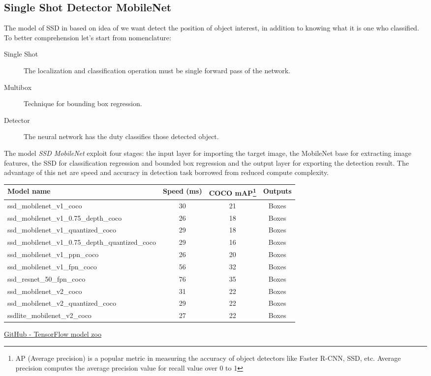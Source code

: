 \subsection{Single Shot Detector MobileNet}
\label{ssec:single-shot-detector}
The model of SSD in based on idea of we want detect the position of object
interest, in addition to knowing what it is one who classified. To better
comprehension let's start from nomenclature:
\begin{description}
\item[Single Shot] The localization and classification operation must be single forward pass of the network.
\item[Multibox] Technique for bounding box regression.
\item[Detector] The neural network has the duty classifies those detected object.
\end{description}
%
The model \emph{SSD MobileNet} exploit four stages: the input layer for
importing the target image, the MobileNet base for extracting image features,
the SSD for classification regression and bounded box regression and the output
layer for exporting the detection result.\cite{Li_2018} 
The advantage of this net are speed and accuracy in detection task borrowed from
reduced compute complexity.
%
\begin{table}[htb]
	\centering
	\begin{tabular}{l c c c}
	\hline
		Model name								&Speed (ms)	& COCO mAP\footnote{AP (Average precision) is a popular metric in measuring the accuracy of object detectors like Faster R-CNN, SSD, etc. Average precision computes the average precision value for recall value over 0 to 1}	& Outputs\\
		\hline
		ssd\_mobilenet\_v1\_coco					&	30		&	21		&	Boxes\\
		ssd\_mobilenet\_v1\_0.75\_depth\_coco 		&	26		&	18		&	Boxes\\
		ssd\_mobilenet\_v1\_quantized\_coco 		&	29		&	18		&	Boxes\\
	ssd\_mobilenet\_v1\_0.75\_depth\_quantized\_coco 	&	29		&	16		&	Boxes\\
		ssd\_mobilenet\_v1\_ppn\_coco 				&	26		&	20		&	Boxes\\
		ssd\_mobilenet\_v1\_fpn\_coco 				&	56		&	32		&	Boxes\\
		ssd\_resnet\_50\_fpn\_coco 					&	76		&	35		&	Boxes\\
		ssd\_mobilenet\_v2\_coco					&	31		&	22		&	Boxes\\
		ssd\_mobilenet\_v2\_quantized\_coco			&	29		&	22		&	Boxes\\
		ssdlite\_mobilenet\_v2\_coco				&	27		&	22		&	Boxes\\
		\hline
	\end{tabular}
	{\href{https://github.com/tensorflow/models/blob/master/research/object_detection/g3doc/detection_model_zoo.md}{GitHub - TensorFlow model zoo}}
	\label{tab:mobilent-timing}
\end{table}
